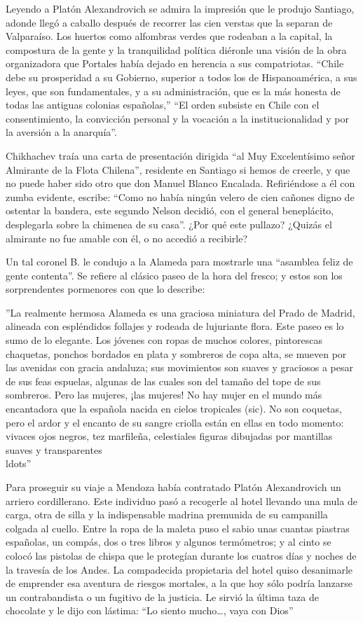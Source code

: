 \documentclass[10pt,twoside,openright]{memoir}
\begin{document}
Leyendo a Platón Alexandrovich se admira la impresión que le produjo
Santiago, adonde llegó a caballo después de recorrer las cien verstas
que la separan de Valparaíso. Los huertos como alfombras verdes que
rodeaban a la capital, la compostura de la gente y la tranquilidad
política diéronle una visión de la obra organizadora que Portales había
dejado en herencia a sus compatriotas. ``Chile debe su prosperidad a su
Gobierno, superior a todos los de Hispanoamérica, a sus leyes, que son
fundamentales, y a su administración, que es la más honesta de todas las
antiguas colonias españolas,'' ``El orden subsiste en Chile con el
consentimiento, la convicción personal y la vocación a la
institucionalidad y por la aversión a la anarquía''.

Chikhachev traía una carta de presentación dirigida ``al Muy
Excelentísimo señor Almirante de la Flota Chilena'', residente en
Santiago si hemos de creerle, y que no puede haber sido otro que don
Manuel Blanco Encalada. Refiriéndose a él con zumba evidente, escribe:
``Como no había ningún velero de cien cañones digno de ostentar la
bandera, este segundo Nelson decidió, con el general beneplácito,
desplegarla sobre la chimenea de su casa''. ¿Por qué este pullazo?
¿Quizás el almirante no fue amable con él, o no accedió a recibirle?

Un tal coronel B. le condujo a la Alameda para mostrarle una ``asamblea
feliz de gente contenta''. Se refiere al clásico paseo de la hora del
fresco; y estos son los sorprendentes pormenores con que lo describe:

''La realmente hermosa Alameda es una graciosa miniatura del Prado de
Madrid, alineada con espléndidos follajes y rodeada de lujuriante flora.
Este paseo es lo sumo de lo elegante. Los jóvenes con ropas de muchos
colores, pintorescas chaquetas, ponchos bordados en plata y sombreros de
copa alta, se mueven por las avenidas con gracia andaluza; sus
movimientos son suaves y graciosos a pesar de sus feas espuelas, algunas
de las cuales son del tamaño del tope de sus sombreros. Pero las
mujeres, ¡las mujeres! No hay mujer en el mundo más encantadora que la
española nacida en cielos tropicales (sic). No son coquetas, pero el
ardor y el encanto de su sangre criolla están en ellas en todo momento:
vivaces ojos negros, tez marfileña, celestiales figuras dibujadas por
mantillas suaves y transparentes\\ldots''

Para proseguir su viaje a Mendoza había contratado Platón Alexandrovich
un arriero cordillerano. Este individuo pasó a recogerle al hotel
llevando una mula de carga, otra de silla y la indispensable madrina
premunida de su campanilla colgada al cuello. Entre la ropa de la maleta
puso el sabio unas cuantas piastras españolas, un compás, dos o tres
libros y algunos termómetros; y al cinto se colocó las pistolas de
chispa que le protegían durante los cuatros días y noches de la travesía
de los Andes. La compadecida propietaria del hotel quiso
desanimarle de emprender esa aventura de riesgos mortales, a la que hoy sólo podría lanzarse un
contrabandista o un fugitivo de la justicia. Le sirvió la última taza de
chocolate y le dijo con lástima: ``Lo siento mucho\ldots, vaya con Dios''
\end{document}
